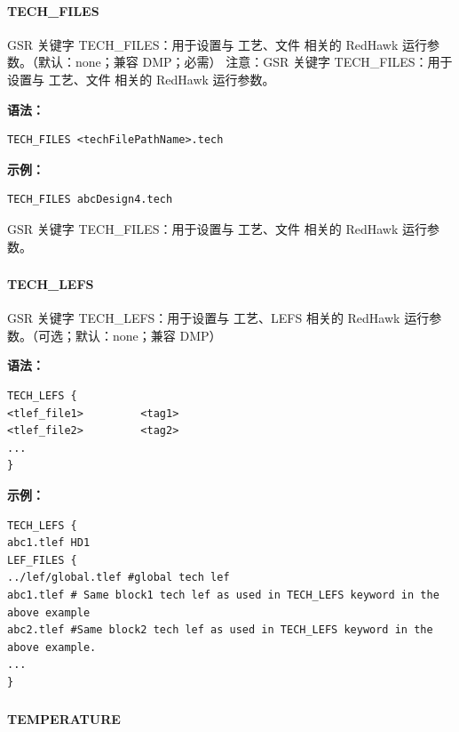 \paragraph*{TECH_FILES}

GSR 关键字 TECH_FILES：用于设置与 工艺、文件 相关的 RedHawk 运行参数。（默认：none；兼容 DMP；必需） 注意：GSR 关键字 TECH_FILES：用于设置与 工艺、文件 相关的 RedHawk 运行参数。

\textbf{语法：}
\begin{lstlisting}
TECH_FILES <techFilePathName>.tech
\end{lstlisting}

\textbf{示例：}
\begin{lstlisting}
TECH_FILES abcDesign4.tech
\end{lstlisting}

\begin{noteBox}
GSR 关键字 TECH\_FILES：用于设置与 工艺、文件 相关的 RedHawk 运行参数。
\end{noteBox}

\subsubsection{}
\paragraph*{TECH_LEFS}

GSR 关键字 TECH_LEFS：用于设置与 工艺、LEFS 相关的 RedHawk 运行参数。（可选；默认：none；兼容 DMP）

\textbf{语法：}
\begin{lstlisting}
TECH_LEFS {
<tlef_file1>         <tag1>
<tlef_file2>         <tag2>
...
}
\end{lstlisting}

\textbf{示例：}
\begin{lstlisting}
TECH_LEFS {
abc1.tlef HD1
LEF_FILES {
../lef/global.tlef #global tech lef
abc1.tlef # Same block1 tech lef as used in TECH_LEFS keyword in the
above example
abc2.tlef #Same block2 tech lef as used in TECH_LEFS keyword in the
above example.
...
}
\end{lstlisting}

\subsubsection{}
\paragraph*{TEMPERATURE}

